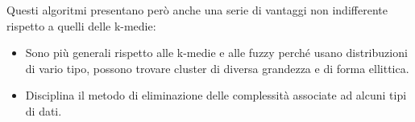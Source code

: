 Questi algoritmi presentano però anche una serie di vantaggi non indifferente rispetto a quelli delle k-medie:
\begin{itemize}
	\item Sono più generali rispetto alle k-medie e alle fuzzy perché usano distribuzioni di vario tipo, possono trovare cluster di diversa grandezza e di forma ellittica.
	\item Disciplina il metodo di eliminazione delle complessità associate ad alcuni tipi di dati.
\end{itemize}

